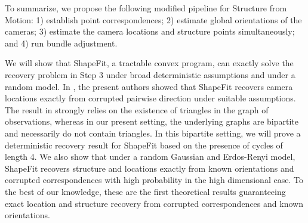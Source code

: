 To summarize, we propose the following modified pipeline for Structure from Motion: 1) establish point correspondences; 2) estimate global orientations of the cameras; 3) estimate the camera locations and structure points simultaneously; and 4) run bundle adjustment.

We will show that ShapeFit, a tractable convex program, can exactly solve the recovery problem in Step 3 under broad deterministic assumptions and under a random model. In \cite{HLV2015}, the present authors showed that ShapeFit recovers camera locations exactly from corrupted pairwise direction under suitable assumptions. The result in \cite{HLV2015} strongly relies on the existence of triangles in the graph of observations, whereas in our present setting, the underlying graphs are bipartite and necessarily do not contain triangles. In this bipartite setting, we will prove a deterministic recovery result for ShapeFit based on the presence of cycles of length 4. We also show that under a random Gaussian and Erdos-Renyi model, ShapeFit recovers structure and locations exactly from known orientations and corrupted correspondences with high probability in the high dimensional case. To the best of our knowledge, these are the first theoretical results guaranteeing exact location and structure recovery from corrupted correspondences and known orientations.

